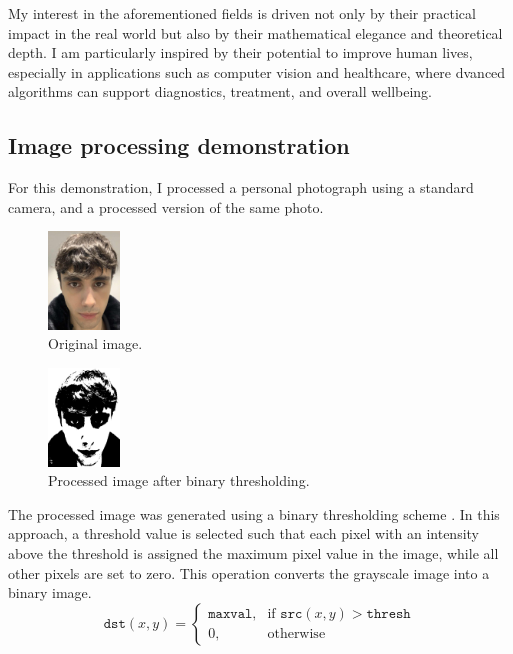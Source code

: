 \documentclass[10pt,twocolumn,letterpaper]{article}
\begin{document}
My interest in the aforementioned fields is driven not only by their
 practical impact in the real world but also by their mathematical 
 elegance and theoretical depth. I am particularly inspired by their 
 potential to improve human lives, especially in applications such as 
 computer vision and healthcare, where 
dvanced algorithms can support diagnostics, treatment, and overall wellbeing.

\subsection{Image processing demonstration}
For this demonstration, I processed a personal photograph using a standard camera,
and a processed version of the same photo.

\begin{figure}[h]
\centering
\includegraphics[width=0.17\textwidth]{p1n.jpeg}
\caption{Original image.}
\label{fig:processed_photo}
\end{figure}


\begin{figure}[h]
\centering
\includegraphics[width=0.17\textwidth]{pi.png}
\caption{Processed image after binary thresholding.}
\label{fig:processed_photo}
\end{figure}

The processed image was generated using a binary thresholding scheme \cite{opencv}
. 
In this approach, a threshold value is selected such 
that each pixel with an intensity above the threshold is 
assigned the maximum pixel value in the image, while all other 
pixels are set to zero. This operation converts the grayscale image
 into a binary image.
\[
\texttt{dst}(x,y) =
\begin{cases}
\texttt{maxval}, & \text{if } \texttt{src}(x,y) > \texttt{thresh} \\
0, & \text{otherwise}
\end{cases}
\]
\end{document}
